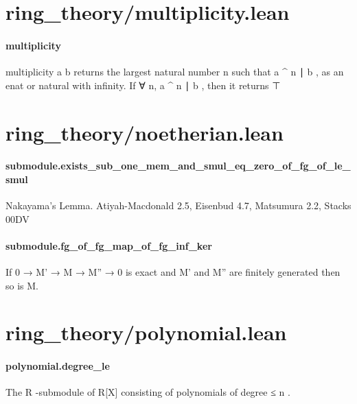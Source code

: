 \documentclass{article}
\begin{document}
\section{ring\_theory/multiplicity.lean}\paragraph{multiplicity}
\par
\colorbox[RGB]{253,246,227}{{{{\color[RGB]{101, 123, 131} multiplicity a b }}}} returns the largest natural number 
\colorbox[RGB]{253,246,227}{{{{\color[RGB]{101, 123, 131} n }}}} such that
\colorbox[RGB]{253,246,227}{{{{\color[RGB]{101, 123, 131} a \textasciicircum{} n ∣ b }}}}, as an 
\colorbox[RGB]{253,246,227}{{{{\color[RGB]{101, 123, 131} enat }}}} or natural with infinity. If 
\colorbox[RGB]{253,246,227}{{{{\color[RGB]{101, 123, 131} ∀ n, a \textasciicircum{} n ∣ b }}}},
then it returns 
\colorbox[RGB]{253,246,227}{{{{\color[RGB]{101, 123, 131} ⊤ }}}}\section{ring\_theory/noetherian.lean}\paragraph{submodule.exists\_sub\_one\_mem\_and\_smul\_eq\_zero\_of\_fg\_of\_le\_smul}
\par
Nakayama's Lemma. Atiyah-Macdonald 2.5, Eisenbud 4.7, Matsumura 2.2, Stacks 00DV
\paragraph{submodule.fg\_of\_fg\_map\_of\_fg\_inf\_ker}
\par
If 0 → M' → M → M'' → 0 is exact and M' and M'' are
finitely generated then so is M.
\section{ring\_theory/polynomial.lean}\paragraph{polynomial.degree\_le}
\par
The 
\colorbox[RGB]{253,246,227}{{{{\color[RGB]{101, 123, 131} R }}}}-submodule of 
\colorbox[RGB]{253,246,227}{{{{\color[RGB]{101, 123, 131} R{[}X{]} }}}} consisting of polynomials of degree ≤ 
\colorbox[RGB]{253,246,227}{{{{\color[RGB]{101, 123, 131} n }}}}.
\end{document}

